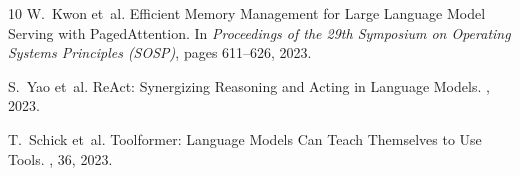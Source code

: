 \documentclass[10pt,twocolumn]{article}
\begin{document}
\begin{thebibliography}{10}
W.~Kwon et~al.
\newblock Efficient Memory Management for Large Language Model Serving with PagedAttention.
\newblock In {\em Proceedings of the 29th Symposium on Operating Systems Principles (SOSP)}, pages 611--626, 2023.

S.~Yao et~al.
\newblock ReAct: Synergizing Reasoning and Acting in Language Models.
, 2023.

T.~Schick et~al.
\newblock Toolformer: Language Models Can Teach Themselves to Use Tools.
, 36, 2023.

\end{thebibliography}
\end{document}
